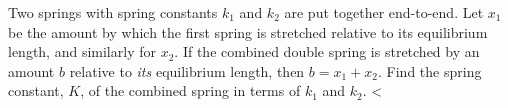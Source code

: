Two springs with spring constants $k_1$ and $k_2$ are put together end-to-end. Let
        $x_1$ be the amount by which the first spring is stretched relative to
        its equilibrium length, and similarly for $x_2$. If the combined double
        spring is stretched by an amount $b$ relative to \emph{its} equilibrium
        length, then $b=x_1+x_2$. Find the spring constant, $K$, of the combined
        spring in terms of $k_1$ and $k_2$.
        <%
\answercheck\hwendpart
